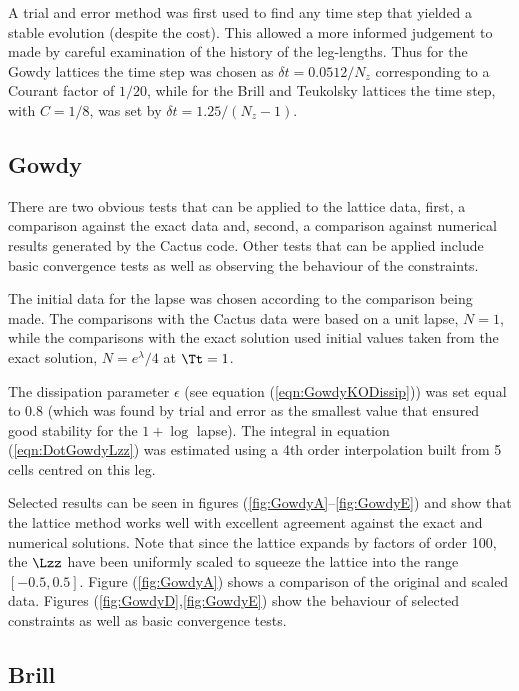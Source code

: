 \documentclass[a4paper,12pt]{article}
\numberwithin{equation}{section}
\begin{document}
A trial and error method was first used to find any time step that yielded a stable
evolution (despite the cost). This allowed a more informed judgement to made by careful
examination of the history of the leg-lengths. Thus for the Gowdy lattices the time step was
chosen as $\delta t = 0.0512/N_z$ corresponding to a Courant factor of $1/20$, while for the
Brill and Teukolsky lattices the time step, with $C=1/8$, was set by $\delta t =
1.25/(N_z-1)$.

\subsection{Gowdy}
\label{sec:GowdyResults}

There are two obvious tests that can be applied to the lattice data, first, a comparison
against the exact data and, second, a comparison against numerical results generated by the
Cactus code. Other tests that can be applied include basic convergence tests as well as
observing the behaviour of the constraints.

The initial data for the lapse was chosen according to the comparison being made. The
comparisons with the Cactus data were based on a unit lapse, $N=1$, while the comparisons
with the exact solution used initial values taken from the exact solution, $N=e^\lambda/4$
at $\Tt=1$.

The dissipation parameter $\epsilon$ (see equation (\ref{eqn:GowdyKODissip})) was set equal
to $0.8$ (which was found by trial and error as the smallest value that ensured good
stability for the $1+\log$ lapse). The integral in equation (\ref{eqn:DotGowdyLzz}) was
estimated using a 4th order interpolation built from 5 cells centred on this leg.

Selected results can be seen in figures (\ref{fig:GowdyA}--\ref{fig:GowdyE}) and show that
the lattice method works well with excellent agreement against the exact and numerical
solutions. Note that since the lattice expands by factors of order 100, the $\Lzz$ have been
uniformly scaled to squeeze the lattice into the range $[-0.5,0.5]$. Figure
(\ref{fig:GowdyA}) shows a comparison of the original and scaled data. Figures
(\ref{fig:GowdyD},\ref{fig:GowdyE}) show the behaviour of selected constraints as well as
basic convergence tests.

\subsection{Brill}
\label{sec:BrillResults}
\end{document}
